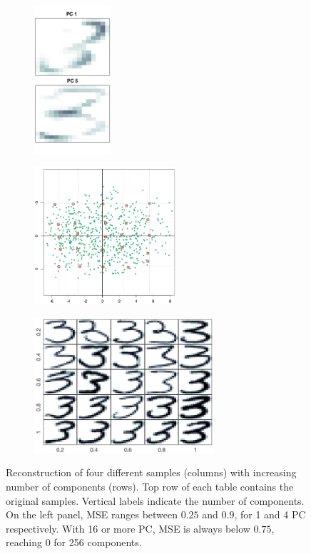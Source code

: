 \documentclass[a4paper, 10pt]{article}
\begin{document}
  \begin{figure}[h]
    \centering
    \hfill
    \begin{subfigure}[t]{0.15\linewidth}
      \includegraphics[width=\linewidth, height=5.5cm]{./lab3/PCA/PC_interpret/PC1+PC5.png}
      \label{fig:few_pc}
    \end{subfigure}
    \hfill
    \begin{subfigure}[t]{5.1cm}
      \includegraphics[width=\linewidth, height= 5.1cm]{./lab3/PCA/PC_interpret/quantiles.png}
      \label{fig:few_pc}
    \end{subfigure}
    \hfill
    \begin{subfigure}[t]{5.0cm}
      \includegraphics[width=\linewidth, height = 5.0cm]{./lab3/PCA/PC_interpret/Y1_X5.png}
      \label{fig:many_pc}
    \end{subfigure}
    \hfill \mbox{}
    \caption{Reconstruction of four different samples (columns) with increasing
      number of components (rows). Top row of each table contains the 
    original samples. Vertical labels indicate the number of components. On the
    left panel, MSE ranges between $0.25$ and $0.9$, for 1 and 4 PC respectively.
  With 16 or more PC, MSE is always below $0.75$, reaching $0$ for 256 components.}
    \label{fig:threes_pc}
  \end{figure}
\end{document}
